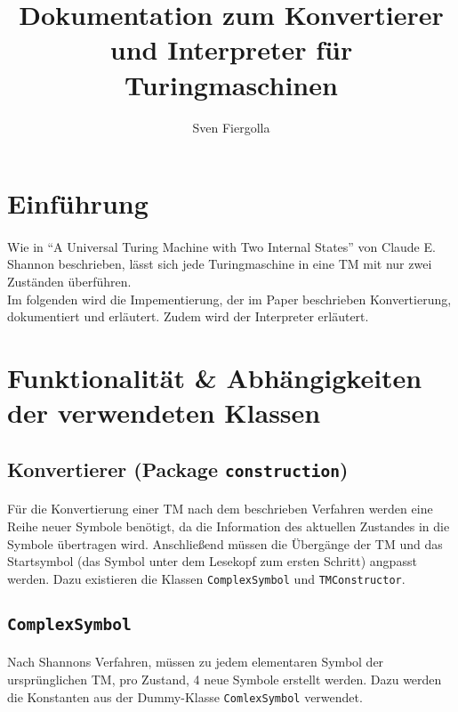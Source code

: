 \documentclass[10pt, a4paper]{article}
\author{Sven Fiergolla}
\title{Dokumentation zum Konvertierer und Interpreter für Turingmaschinen}
\newcommand{\ilc}{\texttt}
\begin{document}
\maketitle


\section*{Einführung}
\paragraph{}
Wie in \enquote{A Universal Turing Machine with Two Internal States} von Claude E. Shannon beschrieben, lässt sich jede Turingmaschine in eine TM mit nur zwei Zuständen überführen.\\
Im folgenden wird die Impementierung, der im Paper beschrieben Konvertierung, dokumentiert und erläutert. Zudem wird der Interpreter erläutert.
\par

\section*{Funktionalität \& Abhängigkeiten der verwendeten Klassen}
\subsection*{Konvertierer (Package \ilc{construction})}
\paragraph{}
Für die Konvertierung einer TM nach dem beschrieben Verfahren werden eine Reihe neuer Symbole benötigt, da die Information des aktuellen Zustandes in die Symbole übertragen wird. Anschließend müssen die Übergänge der TM und das Startsymbol (das Symbol unter dem Lesekopf zum ersten Schritt) angpasst werden. Dazu existieren die Klassen \ilc{ComplexSymbol} und \ilc{TMConstructor}.\par

\subsection*{\ilc{ComplexSymbol}}
\paragraph{}
Nach Shannons Verfahren, müssen zu jedem elementaren Symbol der ursprünglichen TM, pro Zustand, 4 neue Symbole erstellt werden. Dazu werden die Konstanten aus der Dummy-Klasse \ilc{ComlexSymbol} verwendet.\par
\end{document}
